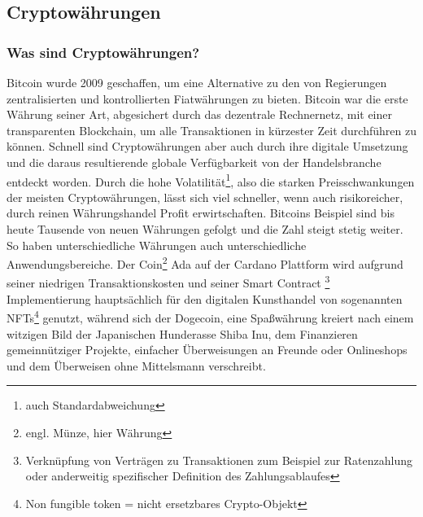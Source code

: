 \documentclass[12pt]{article}
\begin{document}
\subsection{Cryptowährungen}
	\subsubsection{Was sind Cryptowährungen?}
		Bitcoin wurde 2009 geschaffen, um eine Alternative zu den von Regierungen zentralisierten und kontrollierten Fiatwährungen zu bieten. Bitcoin war die erste Währung seiner Art, abgesichert durch das dezentrale Rechnernetz, mit einer transparenten Blockchain, um alle Transaktionen in kürzester Zeit durchführen zu können. Schnell sind Cryptowährungen aber auch durch ihre digitale Umsetzung und die daraus resultierende globale Verfügbarkeit von der Handelsbranche entdeckt worden. Durch die hohe Volatilität\footnote{auch Standardabweichung}, also die starken Preisschwankungen der meisten Cryptowährungen, lässt sich viel schneller, wenn auch risikoreicher, durch reinen Währungshandel Profit erwirtschaften. Bitcoins Beispiel sind bis heute Tausende von neuen Währungen gefolgt und die Zahl steigt stetig weiter. So haben unterschiedliche Währungen auch unterschiedliche Anwendungsbereiche. Der Coin\footnote{engl. Münze, hier Währung} \glqq Ada\grqq{} auf der Cardano Plattform wird aufgrund seiner niedrigen Transaktionskosten und seiner Smart Contract \footnote{Verknüpfung von Verträgen zu Transaktionen zum Beispiel zur Ratenzahlung oder anderweitig spezifischer Definition des Zahlungsablaufes} Implementierung hauptsächlich für den digitalen Kunsthandel von sogenannten NFTs\footnote{Non fungible token = nicht ersetzbares Crypto-Objekt} genutzt, während sich der Dogecoin, eine Spaßwährung kreiert nach einem witzigen Bild der Japanischen Hunderasse Shiba Inu, dem Finanzieren gemeinnütziger Projekte, einfacher Überweisungen an Freunde oder Onlineshops und dem Überweisen ohne Mittelsmann verschreibt.
\end{document}
